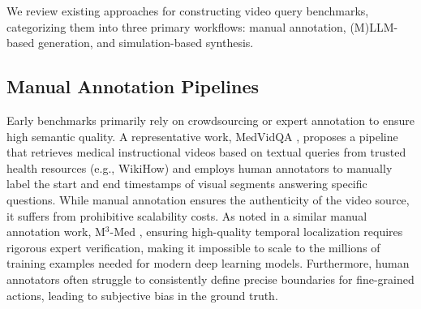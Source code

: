 We review existing approaches for constructing video query benchmarks, categorizing them into three primary workflows: manual annotation, (M)LLM-based generation, and simulation-based synthesis.
\subsection{Manual Annotation Pipelines}
Early benchmarks primarily rely on crowdsourcing or expert annotation to ensure high semantic quality. A representative work, MedVidQA \cite{MedVid}, proposes a pipeline that retrieves medical instructional videos based on textual queries from trusted health resources (e.g., WikiHow) and employs human annotators to manually label the start and end timestamps of visual segments answering specific questions.
While manual annotation ensures the authenticity of the video source, it suffers from prohibitive scalability costs. As noted in a similar manual annotation work, M$^3$-Med \cite{m3med}, ensuring high-quality temporal localization requires rigorous expert verification, making it impossible to scale to the millions of training examples needed for modern deep learning models. Furthermore, human annotators often struggle to consistently define precise boundaries for fine-grained actions, leading to subjective bias in the ground truth.

